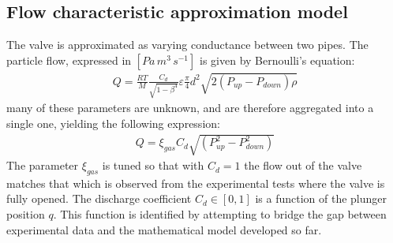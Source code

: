 \documentclass[letterpaper, 10pt, conference]{ieeeconf}
\begin{document}
\subsection{Flow characteristic approximation model}\label{sec:flow_charac}
The valve is approximated as varying conductance between two pipes. The particle flow, expressed in $[\unit{Pa\,m^{3}\,s^{-1}}]$ is given by Bernoulli's equation:
\begin{align}
    Q = \frac{RT}{M} \frac{C_d}{\sqrt{1-\beta^4}}\varepsilon\frac{\pi}{4}d^2\sqrt{2(P_{up}-P_{down})\rho}
\end{align}
many of these parameters are unknown, and are therefore aggregated into a single one, yielding the following expression:
\begin{align}
    Q = \xi_{gas}C_d\sqrt{\left(P_{up}^2-P_{down}^2\right)}
\end{align}
The parameter $\xi_{gas}$ is tuned so that with $C_d=1$ the flow out of the valve matches that which is observed from the experimental tests where the valve is fully opened. 
The discharge coefficient $C_d\in[0,1]$ is a function of the plunger position $q$. This function is identified by attempting to bridge the gap between experimental data and the mathematical model developed so far.
\end{document}
